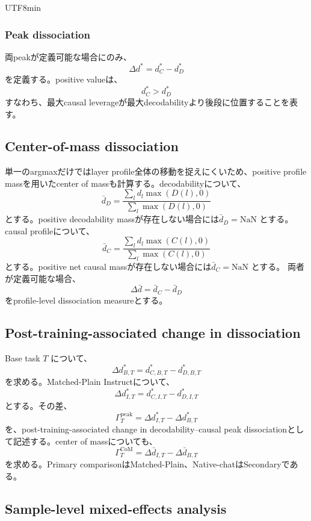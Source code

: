 \documentclass{article} %
\begin{document}
\begin{CJK*}{UTF8}{min}
\subsubsection{Peak dissociation}

両peakが定義可能な場合にのみ、
\[
\Delta d^{*}
=
d_C^{*}
-
d_D^{*}
\]
を定義する。positive valueは、
\[
d_C^{*}>d_D^{*}
\]
すなわち、最大causal leverageが最大decodabilityより後段に位置することを表す。


\subsection{Center-of-mass dissociation}

単一のargmaxだけではlayer profile全体の移動を捉えにくいため、positive profile massを用いたcenter of massも計算する。decodabilityについて、
\[
\bar d_D
=
\frac{
\sum_l
d_l
\max(D(l),0)
}{
\sum_l
\max(D(l),0)
}
\]
とする。positive decodability massが存在しない場合には\(\bar d_D=\mathrm{NaN}\) とする。causal profileについて、
\[
\bar d_C
=
\frac{
\sum_l
d_l
\max(C(l),0)
}{
\sum_l
\max(C(l),0)
}
\]
とする。positive net causal massが存在しない場合には\(\bar d_C=\mathrm{NaN}\) とする。
両者が定義可能な場合、
\[
\Delta\bar d
=
\bar d_C-\bar d_D
\]
をprofile-level dissociation measureとする。


\subsection{Post-training-associated change in dissociation}

Base task \(T\) について、
\[
\Delta d_{B,T}^{*}
=
d_{C,B,T}^{*}
-
d_{D,B,T}^{*}
\]
を求める。Matched-Plain Instructについて、
\[
\Delta d_{I,T}^{*}
=
d_{C,I,T}^{*}
-
d_{D,I,T}^{*}
\]
とする。その差、
\[
\Gamma_T^{\mathrm{peak}}
=
\Delta d_{I,T}^{*}
-
\Delta d_{B,T}^{*}
\]
を、post-training-associated change in decodability--causal peak dissociationとして記述する。center of massについても、
\[
\Gamma_T^{\mathrm{CoM}}
=
\Delta\bar d_{I,T}
-
\Delta\bar d_{B,T}
\]
を求める。Primary comparisonはMatched-Plain、Native-chatはSecondaryである。


\subsection{Sample-level mixed-effects analysis}


\end{CJK*}
\end{document}
